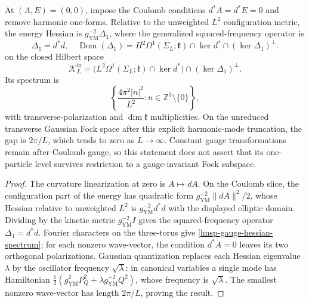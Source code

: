 \begin{proposition}
\label{hnsp-gauge-gaussian-gap}
At \((A,E)=(0,0)\), impose the Coulomb conditions
\(d^*A=d^*E=0\) and remove harmonic one-forms.  Relative to the unweighted
\(L^2\) configuration metric, the energy Hessian is
\(g_{\mathrm{YM}}^{-2}\Delta_1\), where the generalized squared-frequency
operator is
\begin{equation}
 \Delta_1=d^*d,
 \quad
 \operatorname{Dom}(\Delta_1)
 =H^2\Omega^1(\Sigma_L;\mathfrak k)
  \cap\ker d^*\cap(\ker\Delta_1)^\perp.
 \label{hnsp-gauge-hessian-domain}
\end{equation}
on the closed Hilbert space
\begin{equation}
 \mathscr K_{L}^{\mathrm{tr}}
 =\bigl(L^2\Omega^1(\Sigma_L;\mathfrak k)\cap\ker d^*\bigr)
  \cap(\ker\Delta_1)^\perp.
 \label{hnsp-transverse-gauge-hilbert-space}
\end{equation}
Its spectrum is
\begin{equation}
 \left\{\frac{4\pi^2|n|^2}{L^2}:n\in\mathbb Z^3\setminus\{0\}\right\},
 \label{hnsp-gauge-hessian-spectrum}
\end{equation}
with transverse-polarization and \(\dim\mathfrak k\) multiplicities.  On the
unreduced transverse Gaussian Fock space after this explicit harmonic-mode
truncation, the gap is \(2\pi/L\), which tends to zero as \(L\to\infty\).
Constant gauge transformations remain after Coulomb gauge, so this statement
does not assert that its one-particle level survives restriction to a
gauge-invariant Fock subspace.
\end{proposition}

\begin{proof}
The curvature linearization at zero is \(A\mapsto dA\).  On the Coulomb
slice, the configuration part of the energy has quadratic form
\(g_{\mathrm{YM}}^{-2}\|dA\|^2/2\), whose Hessian relative to unweighted
\(L^2\) is \(g_{\mathrm{YM}}^{-2}d^*d\) with the displayed elliptic domain.
Dividing by the kinetic metric \(g_{\mathrm{YM}}^{-2}I\) gives the
squared-frequency operator \(\Delta_1=d^*d\).  Fourier characters on the
three-torus give \eqref{hnsp-gauge-hessian-spectrum}; for each nonzero
wave-vector, the condition \(d^*A=0\) leaves its two orthogonal polarizations.
Gaussian quantization replaces each Hessian eigenvalue \(\lambda\) by the
oscillator frequency \(\sqrt\lambda\): in canonical variables a single mode
has Hamiltonian
\(
 \tfrac12(g_{\mathrm{YM}}^2P_Q^2+
 \lambda g_{\mathrm{YM}}^{-2}Q^2)
\), whose frequency is \(\sqrt\lambda\).  The smallest nonzero wave-vector
has length \(2\pi/L\), proving the result.
\end{proof}

